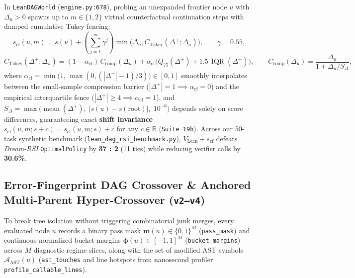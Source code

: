 \documentclass[11pt,a4paper]{article}
\begin{document}
In \texttt{LeanDAGWorld} (\texttt{engine.py:678}), probing an unexpanded frontier node $u$ with $\Delta_u > 0$ spawns up to $m \in \{1, 2\}$ virtual counterfactual continuation steps with damped cumulative Tukey fencing:
\begin{equation}
s_{\text{cf}}(u, m) = s(u) + \left(\sum_{j=1}^m \gamma^j\right) \min\bigl(\Delta_u, C_{\text{Tukey}}(\Delta^+; \Delta_u)\bigr), \qquad \gamma = 0.55,
\tag{4}\label{eq:s_cf}
\end{equation}
\begin{equation}
C_{\text{Tukey}}(\Delta^+; \Delta_u) = (1 - \alpha_{\text{cf}})\,C_{\text{comp}}(\Delta_u) + \alpha_{\text{cf}}\bigl(Q_{75}(\Delta^+) + 1.5\,\operatorname{IQR}(\Delta^+)\bigr), \qquad C_{\text{comp}}(\Delta_u) = \frac{\Delta_u}{1 + \Delta_u / S_\Delta},
\tag{4a}\label{eq:s_cf_interp}
\end{equation}
where $\alpha_{\text{cf}} = \min\bigl(1,\, \max(0, (|\Delta^+| - 1)/3)\bigr) \in [0, 1]$ smoothly interpolates between the small-sample compression barrier ($|\Delta^+| = 1 \implies \alpha_{\text{cf}} = 0$) and the empirical interquartile fence ($|\Delta^+| \ge 4 \implies \alpha_{\text{cf}} = 1$), and $S_\Delta = \max\bigl(\operatorname{mean}(\Delta^+),\; |s(u) - s(\text{root})|,\; 10^{-6}\bigr)$ depends solely on score differences, guaranteeing exact \textbf{shift invariance} $s_{\text{cf}}(u, m; s + c) = s_{\text{cf}}(u, m; s) + c$ for any $c \in \mathbb{R}$ (\texttt{Suite 19h}). Across our 50-task synthetic benchmark (\texttt{lean\_dag\_rsi\_benchmark.py}), $V_{\text{Lean}} + s_{\text{cf}}$ defeats \emph{Dream-RSI} \texttt{OptimalPolicy} by \textbf{37 : 2} (11 ties) while reducing verifier calls by \textbf{30.6\%}.

\subsection{Error-Fingerprint DAG Crossover \& Anchored Multi-Parent Hyper-Crossover (\texttt{v2--v4})}

To break tree isolation without triggering combinatorial junk merges, every evaluated node $u$ records a binary pass mask $\mathbf{m}(u) \in \{0, 1\}^M$ (\texttt{pass\_mask}) and continuous normalized bucket margins $\boldsymbol{\phi}(u) \in [-1, 1]^M$ (\texttt{bucket\_margins}) across $M$ diagnostic regime slices, along with the set of modified AST symbols $\mathcal{A}_{\text{AST}}(u)$ (\texttt{ast\_touches} and line hotspots from nanosecond profiler \texttt{profile\_callable\_lines}).
\end{document}
